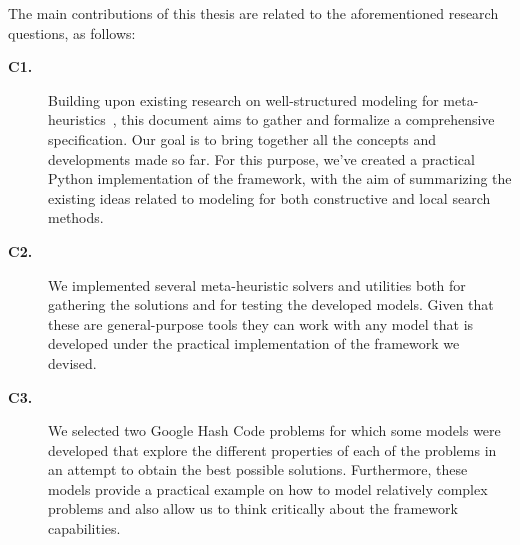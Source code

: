 The main contributions of this thesis are related to the aforementioned research
questions, as follows:

\begin{description}

  \item[\textbf{C1.}] Building upon existing research on well-structured
    modeling for meta-heuristics~\cite{vieira2009uma,fonseca2021nasf4nio,outeiro2021application},
    this document aims to gather and formalize a comprehensive specification. Our
    goal is to bring together all the concepts and developments made so far. For
    this purpose, we've created a practical Python implementation of the
    framework, with the aim of summarizing the existing ideas related to modeling
    for both constructive and local search methods.

  \item[\textbf{C2.}] We implemented several meta-heuristic solvers and utilities
    both for gathering the solutions and for testing the developed models. Given
    that these are general-purpose tools they can work with any model that is developed
    under the practical implementation of the framework we devised.

  \item[\textbf{C3.}] We selected two Google Hash Code problems for which some
    models were developed that explore the different properties of each of the problems
    in an attempt to obtain the best possible solutions. Furthermore, these
    models provide a practical example on how to model relatively complex
    problems and also allow us to think critically about the framework capabilities.
\end{description}